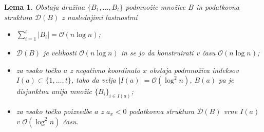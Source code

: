\documentclass[a4paper, 12pt]{book}
\newcommand{\D}{\ensuremath{\mathcal{D}}}
\newcommand{\OO}{\ensuremath{\mathcal{O}}} %
\newtheorem{lema}[izrek]{Lema}
\begin{document}
\begin{lema}
	Obstaja družina $\{ B_1,\dots, B_t\}$ podmnožic množice $B$ in 			podatkovna struktura $\D (B)$ z naslednjimi lastnostmi
	\begin{itemize}
		\item $\sum_{i=1}^t |B_i| = \OO(n\log n)$;
		\item $\D (B)$ je velikosti $\OO(n\log n)$ in se jo da 					konstruirati v času $\OO(n\log n)$;
		\item za vsako točko $a$ z negativno koordinato $x$ obstaja 			podmnožica indeksov $I(a)\subset \{ 1,\dots,t\}$, tako da velja 		$|I(a)|=\OO(\log^2 n)$, $B(a)$ pa je disjunktna unija množic $\{ 			B_i \}_{i\in I(a)}$;
		\item za vsako točko poizvedbe $a$ z $a_x<0$ podatkovna 				struktura $\D (B)$ vrne $I(a)$ v $\OO(\log^2 n)$ času.
	\end{itemize}
\end{lema}
\end{document}
